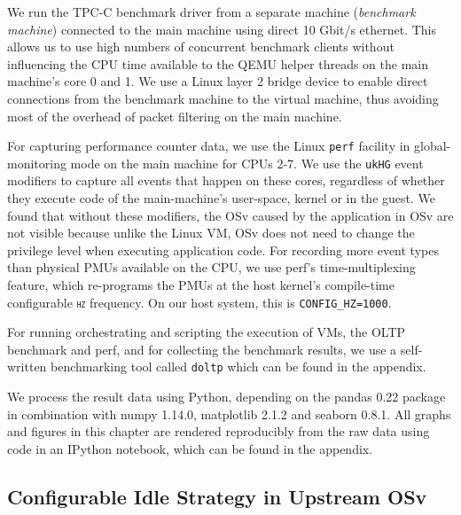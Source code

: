 \documentclass[12pt,a4paper]{book}
\begin{document}
We run the TPC-C benchmark driver from a separate machine (\emph{benchmark machine}) connected to the main machine using direct 10 Gbit/s ethernet.
This allows us to use high numbers of concurrent benchmark clients without influencing the CPU time available to the QEMU helper threads on the main machine's core 0 and 1.
We use a Linux layer 2 bridge device to enable direct connections from the benchmark machine to the virtual machine, thus avoiding most of the overhead of packet filtering on the main machine.

For capturing performance counter data, we use the Linux \texttt{perf} facility in global-monitoring mode on the main machine for CPUs 2-7.
We use the \texttt{ukHG} event modifiers to capture all events that happen on these cores, regardless of whether they execute code of the main-machine's user-space, kernel or in the guest.
We found that without these modifiers, the OSv caused by the application in OSv are not visible because unlike the Linux VM, OSv does not need to change the privilege level when executing application code.
For recording more event types than physical PMUs available on the CPU, we use perf's time-multiplexing feature, which re-programs the PMUs at the host kernel's compile-time configurable \textsc{\texttt{hz}} frequency.
On our host system, this is \texttt{CONFIG\_HZ=1000}.~\cite{perfTimeMultiplexing}

For running orchestrating and scripting the execution of VMs, the OLTP benchmark and perf, and for collecting the benchmark results, we use a self-written benchmarking tool called \texttt{doltp} which can be found in the appendix.

We process the result data using Python, depending on the pandas 0.22 package in combination with numpy 1.14.0, matplotlib 2.1.2 and seaborn 0.8.1.
All graphs and figures in this chapter are rendered reproducibly from the raw data using code in an IPython notebook, which can be found in the appendix.

\subsection{Configurable Idle Strategy in Upstream OSv}\label{ch:eval:setup:idle}
\end{document}
